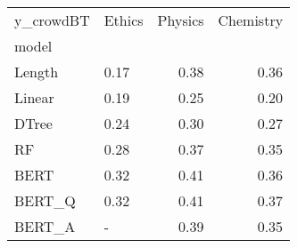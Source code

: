 \begin{tabular}{llrr}
\toprule
y\_crowdBT & Ethics &  Physics &  Chemistry \\
model  &        &          &            \\
\midrule
Length &   0.17 &     0.38 &       0.36 \\
Linear &   0.19 &     0.25 &       0.20 \\
DTree  &   0.24 &     0.30 &       0.27 \\
RF     &   0.28 &     0.37 &       0.35 \\
BERT   &   0.32 &     0.41 &       0.36 \\
BERT\_Q &   0.32 &     0.41 &       0.37 \\
BERT\_A &      - &     0.39 &       0.35 \\
\bottomrule
\end{tabular}
